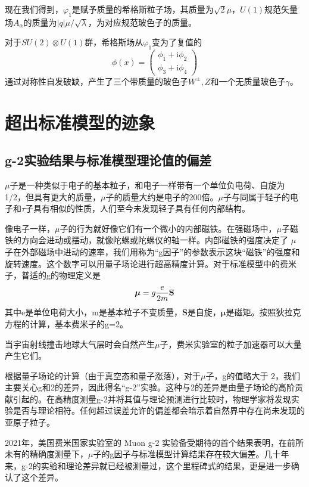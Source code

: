 现在我们得到，$\varphi_1$是赋予质量的希格斯粒子场，其质量为$\sqrt{2}\mu$，$U(1)$规范矢量场$A_\alpha$的质量为$|q|\mu/\sqrt{\lambda}$，为对应规范玻色子的质量。

对于$SU(2)\otimes U(1)$群，希格斯场从$\varphi_1$变为了复值的
\begin{equation}
    \phi (x) ={\left ( \begin{matrix} \phi_1 + \mathrm{i} \phi_2\\ \phi_3 + \mathrm{i} \phi_4 \end{matrix} \right )}
\end{equation}
通过对称性自发破缺，产生了三个带质量的玻色子$W^\pm,Z$和一个无质量玻色子$\gamma$。

\section{超出标准模型的迹象}
\subsection{g-2实验结果与标准模型理论值的偏差}
$\mu$子是一种类似于电子的基本粒子，和电子一样带有一个单位负电荷、自旋为1/2，但具有更大的质量，$\mu$子的质量大约是电子的200倍。$\mu$子与同属于轻子的电子和$\tau$子具有相似的性质，人们至今未发现轻子具有任何内部结构。

像电子一样，$\mu$子的行为就好像它们有一个微小的内部磁铁。在强磁场中，$\mu$子磁铁的方向会进动或摆动，就像陀螺或陀螺仪的轴一样。内部磁铁的强度决定了 $\mu$ 子在外部磁场中进动的速率，我们用称为“g因子”的参数表示这块“磁铁”的强度和旋转速度。这个数字可以用量子场论进行超高精度计算。对于标准模型中的费米子，普适的g的物理定义是
\begin{equation}
    \boldsymbol \mu = g {e \over 2m} \mathbf S 
\end{equation}
其中e是单位电荷大小，m是基本粒子不变质量，$\mathbf S $是自旋，$\boldsymbol\mu$是磁矩。按照狄拉克方程的计算，基本费米子的g=2。

当宇宙射线撞击地球大气层时会自然产生$\mu$子，费米实验室的粒子加速器可以大量产生它们。

根据量子场论的计算（由于真空态和量子涨落），对于$\mu$子，g的值略大于 2，我们主要关心g和2的差异，因此得名“g-2”实验。这种与2的差异是由量子场论的高阶贡献引起的。在高精度测量g-2并将其值与理论预测进行比较时，物理学家将发现实验是否与理论相符。任何超过误差允许的偏差都会暗示着自然界中存在尚未发现的亚原子粒子。

2021年，美国费米国家实验室的 Muon g-2 实验备受期待的首个结果表明，在前所未有的精确度测量下，$\mu$子的g因子与标准模型计算结果存在较大偏差。几十年来，g-2的实验和理论差异就已经被测量过，这个里程碑式的结果，更是进一步确认了这个差异。


